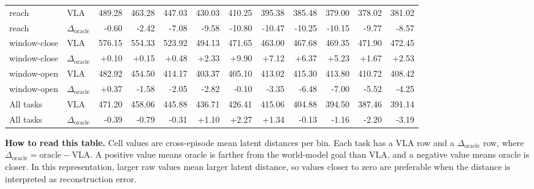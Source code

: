 \begin{center}
{\begin{tabular}{llrrrrrrrrrr}
\hline
reach & VLA & 489.28 & 463.28 & 447.03 & 430.03 & 410.25 & 395.38 & 385.48 & 379.00 & 378.02 & 381.02 \\
reach & $\Delta_{\mathrm{oracle}}$ & -0.60 & -2.42 & -7.08 & -9.58 & -10.80 & -10.47 & -10.25 & -10.15 & -9.77 & -8.57 \\
\hline
window-close & VLA & 576.15 & 554.33 & 523.92 & 494.13 & 471.65 & 463.00 & 467.68 & 469.35 & 471.90 & 472.45 \\
window-close & $\Delta_{\mathrm{oracle}}$ & +0.10 & +0.15 & +0.48 & +2.33 & +9.90 & +7.12 & +6.37 & +5.23 & +1.67 & +2.53 \\
\hline
window-open & VLA & 482.92 & 454.50 & 414.17 & 403.37 & 405.10 & 413.02 & 415.30 & 413.80 & 410.72 & 408.42 \\
window-open & $\Delta_{\mathrm{oracle}}$ & +0.37 & -1.58 & -2.05 & -2.82 & -0.10 & -3.35 & -6.48 & -7.00 & -5.52 & -4.25 \\
\hline
All tasks & VLA & 471.20 & 458.06 & 445.88 & 436.71 & 426.41 & 415.06 & 404.88 & 394.50 & 387.46 & 391.14 \\
All tasks & $\Delta_{\mathrm{oracle}}$ & -0.39 & -0.79 & -0.31 & +1.10 & +2.27 & +1.34 & -0.13 & -1.16 & -2.20 & -3.19 \\
\hline
\hline
\end{tabular}
}
\end{center}
\par\vspace{0.3em}
\noindent\small\textbf{How to read this table.} Cell values are cross-episode mean latent distances per bin. Each task has a VLA row and a \(\Delta_{\mathrm{oracle}}\) row, where \(\Delta_{\mathrm{oracle}} = \mathrm{oracle} - \mathrm{VLA}\). A positive value means oracle is farther from the world-model goal than VLA, and a negative value means oracle is closer. In this representation, larger raw values mean larger latent distance, so values closer to zero are preferable when the distance is interpreted as reconstruction error.

